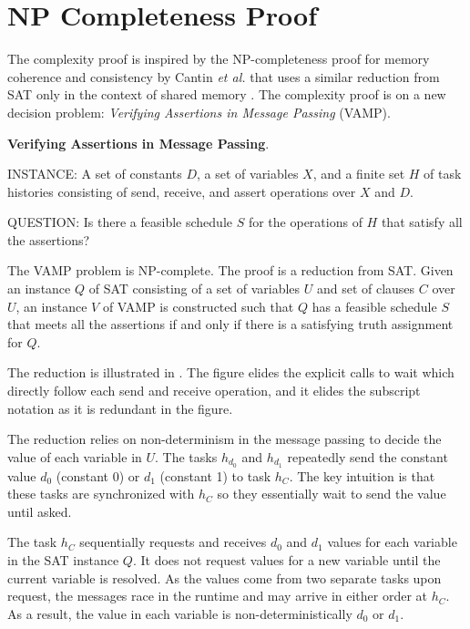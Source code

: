 \section{NP Completeness Proof} 
The complexity proof is inspired by the NP-completeness proof for
memory coherence and consistency by Cantin \emph{et al.} that uses a
similar reduction from SAT only in the context of shared memory
\cite{Cantin:2005:CVM:1070608.1070722}. The complexity proof is on a
new decision problem: \emph{Verifying Assertions in Message Passing}
(VAMP).
\begin{definition}
\textbf{Verifying Assertions in Message Passing}.
\begin{compactdesc}
\item{INSTANCE}: A set of constants $D$, a set of variables $X$, and a
  finite set $H$ of task histories consisting of send, receive, and
  assert operations over $X$ and $D$.
\item{QUESTION}: Is there a feasible schedule $S$ for the operations
  of $H$ that satisfy all the assertions?
\end{compactdesc}
\label{def:np1}
\end{definition}

The VAMP problem is NP-complete. The proof is a reduction from
SAT. Given an instance $Q$ of SAT consisting of a set of variables $U$
and set of clauses $C$ over $U$, an instance $V$ of VAMP is
constructed such that $Q$ has a feasible schedule $S$ that meets all
the assertions if and only if there is a satisfying truth assignment
for $Q$.

The reduction is illustrated in . The figure elides
the explicit calls to wait which directly follow each send and receive
operation, and it elides the subscript notation as it is redundant in
the figure.

The reduction relies on non-determinism in the message passing to
decide the value of each variable in $U$.  The tasks $h_{d_0}$ and
$h_{d_1}$ repeatedly send the constant value $d_0$ (constant 0) or
$d_1$ (constant 1) to task $h_C$. The key intuition is that these
tasks are synchronized with $h_C$ so they essentially wait to send the
value until asked.

The task $h_C$ sequentially requests and receives $d_0$ and $d_1$
values for each variable in the SAT instance $Q$. It does not request
values for a new variable until the current variable is resolved. As
the values come from two separate tasks upon request, the messages
race in the runtime and may arrive in either order at $h_C$. As a
result, the value in each variable is non-deterministically $d_0$ or $d_1$.

